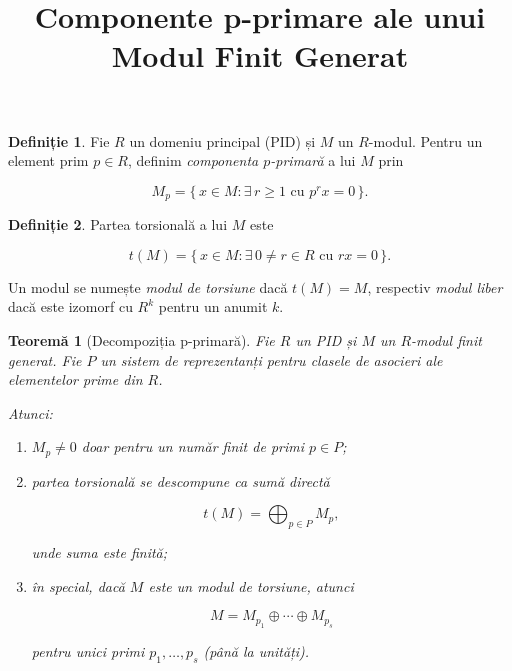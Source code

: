 \documentclass[12pt]{article}
\title{Componente p-primare ale unui Modul Finit Generat}
\author{}
\date{}
\theoremstyle{definition}
\newtheorem{definition}{Definiție}
\theoremstyle{plain}
\newtheorem{theorem}{Teoremă}
\begin{document}
\maketitle

\begin{definition}
Fie $R$ un domeniu principal (PID) și $M$ un $R$-modul. Pentru un element prim $p \in R$,
definim \emph{componenta $p$-primară} a lui $M$ prin


\[
M_p = \{\, x \in M : \exists\, r \ge 1 \text{ cu } p^r x = 0 \,\}.
\]


\end{definition}

\begin{definition}
Partea torsională a lui $M$ este


\[
t(M) = \{\, x \in M : \exists\, 0 \ne r \in R \text{ cu } rx = 0 \,\}.
\]


Un modul se numește \emph{modul de torsiune} dacă $t(M) = M$, respectiv
\emph{modul liber} dacă este izomorf cu $R^k$ pentru un anumit $k$.
\end{definition}

\begin{theorem}[Decompoziția p-primară]
Fie $R$ un PID și $M$ un $R$-modul finit generat. Fie $P$ un sistem de reprezentanți
pentru clasele de asocieri ale elementelor prime din $R$.

Atunci:
\begin{enumerate}
    \item[(i)] $M_p \ne 0$ doar pentru un număr finit de primi $p \in P$;
    \item[(ii)] partea torsională se descompune ca sumă directă
    

\[
    t(M) = \bigoplus_{p \in P} M_p,
    \]


    unde suma este finită;
    \item[(iii)] în special, dacă $M$ este un modul de torsiune, atunci
    

\[
    M = M_{p_1} \oplus \cdots \oplus M_{p_s}
    \]


    pentru unici primi $p_1, \dots, p_s$ (până la unități).
\end{enumerate}
\end{theorem}
\end{document}
